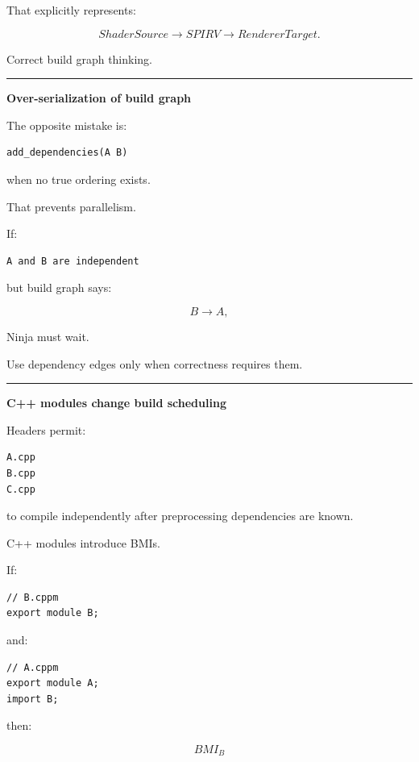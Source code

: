 That explicitly represents:

\[
ShaderSource
\rightarrow
SPIRV
\rightarrow
RendererTarget.
\]

Correct build graph thinking.

\begin{center}\rule{0.5\linewidth}{0.5pt}\end{center}

\textbf{Over-serialization of build graph}

The opposite mistake is:

\begin{verbatim}
add_dependencies(A B)
\end{verbatim}

when no true ordering exists.

That prevents parallelism.

If:

\begin{verbatim}
A and B are independent
\end{verbatim}

but build graph says:

\[
B\rightarrow A,
\]

Ninja must wait.

Use dependency edges only when correctness requires them.

\begin{center}\rule{0.5\linewidth}{0.5pt}\end{center}

\textbf{C++ modules change build scheduling}

Headers permit:

\begin{verbatim}
A.cpp
B.cpp
C.cpp
\end{verbatim}

to compile independently after preprocessing dependencies are known.

C++ modules introduce BMIs.

If:

\begin{verbatim}
// B.cppm
export module B;
\end{verbatim}

and:

\begin{verbatim}
// A.cppm
export module A;
import B;
\end{verbatim}

then:

\[
BMI_B
\]

